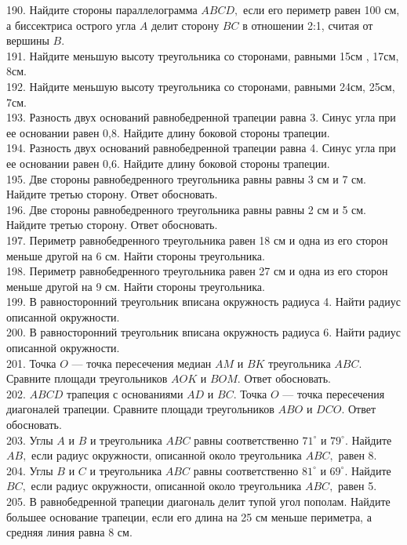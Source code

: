 190. Найдите стороны параллелограмма $ABCD,$ если его периметр равен 100 см, а биссектриса острого угла $A$ делит сторону $BC$ в отношении 2:1, считая от вершины $B.$\\
191. Найдите меньшую высоту треугольника со сторонами, равными 15см , 17см, 8см.\\
192. Найдите меньшую высоту треугольника со сторонами, равными 24см, 25см, 7см.\\
193. Разность двух оснований равнобедренной трапеции равна 3. Синус угла при ее основании равен 0,8. Найдите длину боковой стороны трапеции.\\
194. Разность двух оснований равнобедренной трапеции равна 4. Синус угла при ее основании равен 0,6. Найдите длину боковой стороны трапеции.\\
195. Две стороны равнобедренного треугольника равны равны 3 см и 7 см. Найдите третью сторону. Ответ обосновать.\\
196. Две стороны равнобедренного треугольника равны равны 2 см и 5 см. Найдите третью сторону. Ответ обосновать.\\
197. Периметр равнобедренного треугольника равен 18 см и одна из его сторон меньше другой на 6 см. Найти стороны треугольника.\\
198. Периметр равнобедренного треугольника равен 27 см и одна из его сторон меньше другой на 9 см. Найти стороны треугольника.\\
199. В равносторонний треугольник вписана окружность радиуса 4. Найти радиус описанной окружности.\\
200. В равносторонний треугольник вписана окружность радиуса 6. Найти радиус описанной окружности.\\
201. Точка $O$ --- точка пересечения медиан $AM$ и $BK$ треугольника $ABC.$ Сравните площади треугольников $AOK$ и $BOM.$ Ответ обосновать.\\
202. $ABCD$ трапеция с основаниями $AD$ и $BC.$ Точка $O$ --- точка пересечения диагоналей трапеции. Сравните площади треугольников $ABO$ и $DCO.$ Ответ обосновать.\\
203. Углы $A$ и $B$ и треугольника $ABC$ равны соответственно $71^\circ$ и $79^\circ.$ Найдите $AB,$ если радиус окружности, описанной около треугольника $ABC,$ равен 8.\\
204. Углы $B$ и $C$ и треугольника $ABC$ равны соответственно $81^\circ$ и $69^\circ.$ Найдите $BC,$ если радиус окружности, описанной около треугольника $ABC,$ равен 5.\\
205. В равнобедренной трапеции диагональ делит тупой угол пополам. Найдите большее основание трапеции, если его длина на 25 см меньше периметра, а средняя линия равна 8 см.\\

